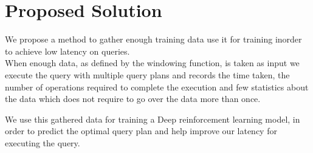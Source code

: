 \section{Proposed Solution}
We propose a method to gather enough training data use it for training inorder to achieve low latency on queries.\\
When enough data, as defined by the windowing function, is taken as input we execute the query with multiple query plans and records the time taken, the number of operations required to complete the execution and few statistics about the data which does not require to go over the data more than once.
\par We use this gathered data for training a Deep reinforcement learning model, in order to predict the optimal query plan and help improve our latency for executing the query.  


